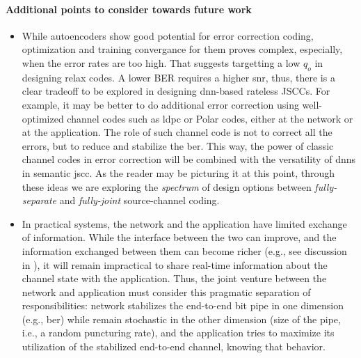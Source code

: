 \paragraph*{Additional points to consider towards future work}
\begin{itemize}
    \item While autoencoders show good potential for error correction coding, optimization  and training convergance for them proves complex, especially, when the error rates are too high. That suggests targetting a low $q_o$ in designing \gls{relax} codes. A lower BER requires a  higher \gls{snr}, thus,  there is a clear tradeoff to be explored in designing \gls{dnn}-based rateless JSCCs. For example, it may be better to do additional error correction using well-optimized channel codes such as \gls{ldpc} or Polar codes, either at the network or at the application.  The role of such channel code is not to correct all the errors, but to reduce and stabilize the \gls{ber}. This way, the power of classic channel codes in error correction will be combined with the versatility of \glspl{dnn} in semantic \gls{jscc}. As the reader may be picturing it at this point, through these ideas we are exploring the \emph{spectrum} of design options between \emph{fully-separate} and \emph{fully-joint} source-channel coding. 
    \item In practical systems, the network and the application have limited exchange of information. While the interface between the two can improve, and the information exchanged between them can become richer (e.g., see discussion in ), it will remain impractical to share real-time information about the channel state with the application. Thus, the joint venture between the network and application must consider this pragmatic separation of responsibilities: network stabilizes the end-to-end bit pipe in one dimension (e.g., \gls{ber}) while remain stochastic in the other dimension (size of the pipe, i.e., a random puncturing rate), and the application tries to maximize its utilization of the stabilized end-to-end channel, knowing that behavior. 
\end{itemize}


